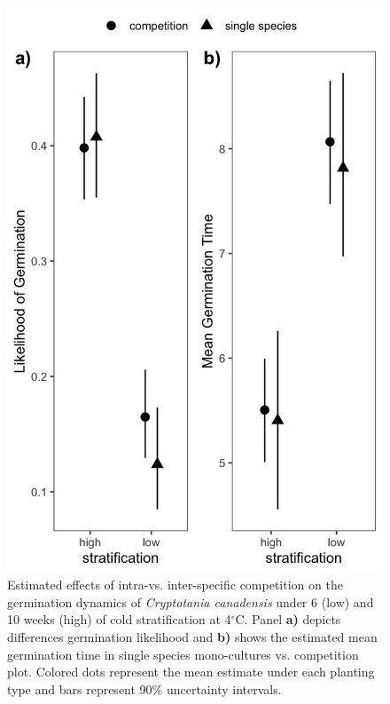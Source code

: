 \documentclass{article}[11pt]
\begin{document}
\begin{figure}[h!]
    \centering
\includegraphics[width=.7\textwidth]{..//figure/nichemodfication.jpeg}
   \caption{Estimated effects of intra-vs. inter-specific competition on the germination dynamics of \textit{Cryptotania canadensis} under 6 (low) and 10 weeks (high) of cold stratification at 4$^{\circ}$C. Panel \textbf{a)} depicts differences germination likelihood and \textbf{b)} shows the estimated mean germination time in single species mono-cultures vs. competition plot. Colored dots represent the mean estimate under each planting type and bars represent 90\% uncertainty intervals. } 
   \label{fig:nichemod}
\end{figure}
\end{document}
